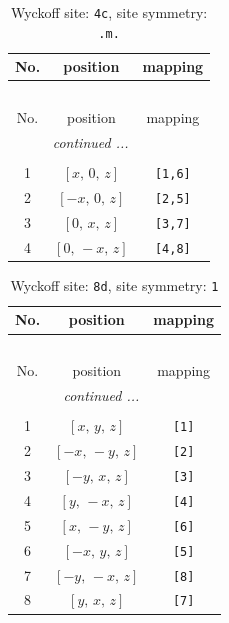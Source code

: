 \documentclass[fleqn,8pt]{jsarticle}
\begin{document}
\renewcommand{\arraystretch}{1.2}
\begin{longtable}{ccc}
\caption{Wyckoff site: {\tt 4c}, site symmetry: {\tt .m.}}
 \\
 \hline \hline
No. & position & mapping \\ \hline \endfirsthead

\multicolumn{2}{l}{\tablename\ \thetable{}} \\
 \hline \hline
No. & position & mapping \\ \hline \endhead

 \hline \hline
\multicolumn{2}{r}{\footnotesize\it continued ...} \\ \endfoot

 \hline \hline
\multicolumn{2}{r}{} \\ \endlastfoot

1 & $\left[ x,\, 0,\, z \right]$ & {\tt [1,6]} \\ \hline
2 & $\left[ - x,\, 0,\, z \right]$ & {\tt [2,5]} \\ \hline
3 & $\left[ 0,\, x,\, z \right]$ & {\tt [3,7]} \\ \hline
4 & $\left[ 0,\, - x,\, z \right]$ & {\tt [4,8]} \\
\end{longtable}
\renewcommand{\arraystretch}{1.2}
\begin{longtable}{ccc}
\caption{Wyckoff site: {\tt 8d}, site symmetry: {\tt 1}}
 \\
 \hline \hline
No. & position & mapping \\ \hline \endfirsthead

\multicolumn{2}{l}{\tablename\ \thetable{}} \\
 \hline \hline
No. & position & mapping \\ \hline \endhead

 \hline \hline
\multicolumn{2}{r}{\footnotesize\it continued ...} \\ \endfoot

 \hline \hline
\multicolumn{2}{r}{} \\ \endlastfoot

1 & $\left[ x,\, y,\, z \right]$ & {\tt [1]} \\ \hline
2 & $\left[ - x,\, - y,\, z \right]$ & {\tt [2]} \\ \hline
3 & $\left[ - y,\, x,\, z \right]$ & {\tt [3]} \\ \hline
4 & $\left[ y,\, - x,\, z \right]$ & {\tt [4]} \\ \hline
5 & $\left[ x,\, - y,\, z \right]$ & {\tt [6]} \\ \hline
6 & $\left[ - x,\, y,\, z \right]$ & {\tt [5]} \\ \hline
7 & $\left[ - y,\, - x,\, z \right]$ & {\tt [8]} \\ \hline
8 & $\left[ y,\, x,\, z \right]$ & {\tt [7]} \\
\end{longtable}
\end{document}
